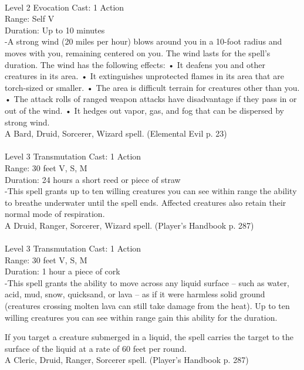 \documentclass[10pt,twocolumn]{report}
\begin{document}
 \\
Level 2 \quad Evocation \quad Cast: 1 Action\\
Range: Self \quad V\\
Duration: Up to 10 minutes \quad \\
-A strong wind (20 miles per hour) blows around you in a 10-foot radius and moves with you, remaining centered on you. The wind lasts for the spell’s duration.
The wind has the following effects:
• It deafens you and other creatures in its area.
• It extinguishes unprotected flames in its area that are torch-sized or smaller.
• The area is difficult terrain for creatures other than you.
• The attack rolls of ranged weapon attacks have disadvantage if they pass in or out of the wind.
• It hedges out vapor, gas, and fog that can be dispersed by strong wind.\\
A Bard, Druid, Sorcerer, Wizard spell. (Elemental Evil p. 23) \\


 \\
Level 3 \quad Transmutation \quad Cast: 1 Action\\
Range: 30 feet \quad V, S, M\\
Duration: 24 hours \quad a short reed or piece of straw\\
-This spell grants up to ten willing creatures you can see within range the ability to breathe underwater until the spell ends. Affected creatures also retain their normal mode of respiration.\\
A Druid, Ranger, Sorcerer, Wizard spell. (Player's Handbook p. 287) \\


 \\
Level 3 \quad Transmutation \quad Cast: 1 Action\\
Range: 30 feet \quad V, S, M\\
Duration: 1 hour \quad a piece of cork\\
-This spell grants the ability to move across any liquid surface – such as water, acid, mud, snow, quicksand, or lava – as if it were harmless solid ground (creatures crossing molten lava can still take damage from the heat).
Up to ten willing creatures you can see within range gain this ability for the duration.

If you target a creature submerged in a liquid, the spell carries the target to the surface of the liquid at a rate of 60 feet per round.\\
A Cleric, Druid, Ranger, Sorcerer spell. (Player's Handbook p. 287) \\
\end{document}

